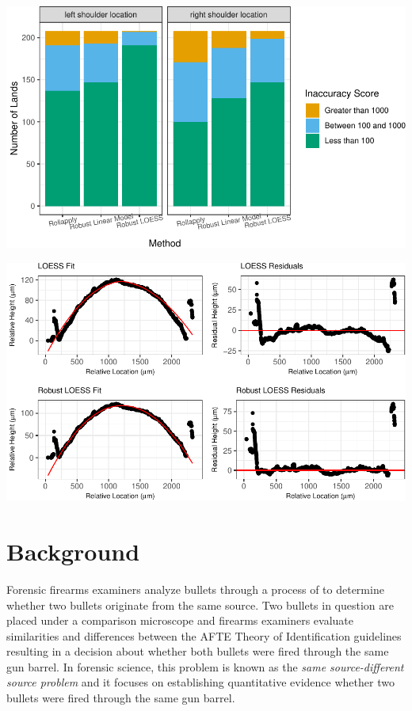 \documentclass[12pt]{article}
\begin{document}
\includegraphics{writeup_files/figure-latex/unnamed-chunk-3-1.pdf}

\includegraphics{writeup_files/figure-latex/unnamed-chunk-4-1.pdf}

\section{Background}

Forensic firearms examiners analyze bullets through a process of
{\color{teal}{visual comparison}} to determine whether two bullets
originate from the same source. Two bullets in question are placed under
a comparison microscope and firearms examiners evaluate similarities and
differences between
{\color{teal}{striated toolmarks produced on fired bullets from rifled barrels. The assessment of these patterns follows}}
the AFTE Theory of Identification \citep{AFTE} guidelines resulting in a
decision about whether both bullets were fired through the same gun
barrel. In forensic science, this problem is known as the \emph{same
source-different source problem} {\color{teal}{[see @Ommen1]}} and it
focuses on establishing quantitative evidence whether two bullets were
fired through the same gun barrel.
\end{document}
